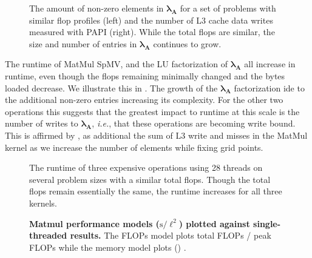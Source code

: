 %
%
%
\begin{figure}[h]
	
	\caption{
	    The amount of non-zero elements in $\symbf{\lambda_{\textbf{A}}}$ for a set of problems with similar flop profiles (left) and the number of L3 cache data writes measured with PAPI (right). 
	    While the total flops are similar, the size and number of entries in $\symbf{\lambda_{\textbf{A}}}$ continues to grow. 
	    }
    \label{fig:mem_exp_b}
\end{figure}

\noindent
The runtime of MatMul SpMV, and the LU factorization of $\symbf{\lambda}_{\textbf{A}}$ all increase in runtime, even though the flops remaining minimally changed and the bytes loaded decrease. 
We illustrate this in . 
The growth of the $\symbf{\lambda}_{\textbf{A}}$ factorization ide to the additional non-zero entries increasing its complexity.
For the other two operations this suggests that the greatest impact to runtime at this scale is the number of writes to $\symbf{\lambda}_{\textbf{A}}$, \emph{i.e.}, that these operations are becoming write bound.
This is affirmed by , as additional the sum of L3 write and misses in the MatMul kernel as we increase the number of elements while fixing grid points.  


\begin{figure}[h]
	
	\caption{
	    The runtime of three expensive operations using 28 threads on several problem sizes with a similar total flops. 
	    Though the total flops remain essentially the same, the runtime increases for all three kernels.
	    }
	\label{fig:mem_exp_a}
\end{figure}



%
%
%
\begin{figure}[!b]
	{\centering 
	}
	\caption{\textbf{Matmul performance models (}$\text{s}/\ell^2$\textbf{) plotted against single-threaded results.} The FLOPs model plots total FLOPs / peak FLOPs while the memory model plots () . 
	}
	\label{fig:ftmf_comp_1}
\end{figure}


%	




%	

